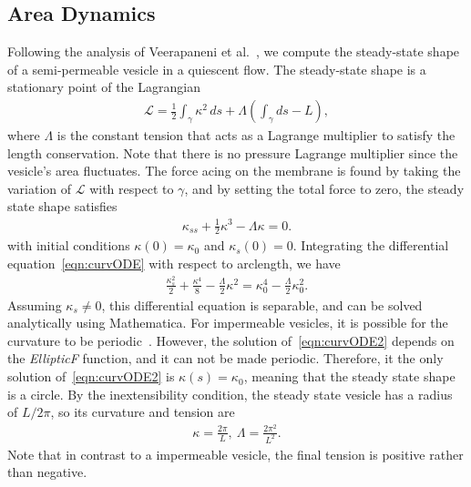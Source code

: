\documentclass[aps,prl,showpacs]{revtex4}
\begin{document}
\subsection{Area Dynamics}
Following the analysis of Veerapaneni et al.~\cite{vee-raj-bir-pur2009},
we compute the steady-state shape of a semi-permeable vesicle in a
quiescent flow. The steady-state shape is a stationary point of the
Lagrangian
\begin{align}
  \mathcal{L} = \frac{1}{2}\int_{\gamma} \kappa^2 \, ds +
    \Lambda \left(\int_{\gamma} ds  - L \right),
\end{align}
where $\Lambda$ is the constant tension that acts as a Lagrange
multiplier to satisfy the length conservation. Note that there is no
pressure Lagrange multiplier since the vesicle's area fluctuates. The
force acing on the membrane is found by taking the variation of
$\mathcal{L}$ with respect to $\gamma$, and by setting the total force
to zero, the steady state shape satisfies
\begin{align}
  \kappa_{ss} + \frac{1}{2}\kappa^3 - \Lambda \kappa = 0.
  \label{eqn:curvODE}
\end{align}
with initial conditions $\kappa(0) = \kappa_0$ and $\kappa_s(0) = 0$.
Integrating the differential equation~\eqref{eqn:curvODE} with respect
to arclength, we have
\begin{align}
  \frac{\kappa_s^2}{2} + \frac{\kappa^4}{8} - 
    \frac{\Lambda}{2}\kappa^2 = \kappa_0^4 - \frac{\Lambda}{2}\kappa_0^2.
  \label{eqn:curvODE2}
\end{align}
Assuming $\kappa_s \neq 0$, this differential equation is separable, and
can be solved analytically using Mathematica. For impermeable vesicles,
it is possible for the curvature to be
periodic~\cite{vee-raj-bir-pur2009}. However, the solution
of~\eqref{eqn:curvODE2} depends on the {\em EllipticF} function, and it
can not be made periodic. Therefore, it the only solution
of~\eqref{eqn:curvODE2} is $\kappa(s) = \kappa_0$, meaning that the
steady state shape is a circle. By the inextensibility condition, the
steady state vesicle has a radius of $L/2\pi$, so its curvature and
tension are
\begin{align}
  \kappa = \frac{2\pi}{L}, \: \Lambda = \frac{2\pi^2}{L^2}.
  \label{eqn:SSshape}
\end{align}
Note that in contrast to a impermeable vesicle, the final tension is
positive rather than negative.
\end{document}
